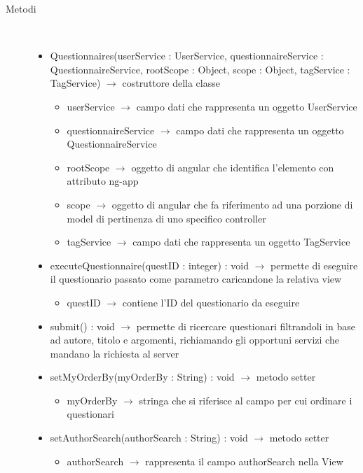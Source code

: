 \begin{description}
\item[Metodi] \hfill \\
\vspace{-7mm}
\begin{itemize}
	\item Questionnaires(userService : UserService, questionnaireService : QuestionnaireService, rootScope : Object, scope : Object, tagService : TagService) $\rightarrow$ costruttore della classe\begin{itemize}
		\item userService $\rightarrow$ campo dati che rappresenta un oggetto UserService
		\item questionnaireService $\rightarrow$ campo dati che rappresenta un oggetto QuestionnaireService
		\item rootScope $\rightarrow$ oggetto di angular che identifica l’elemento con attributo ng-app
		\item scope $\rightarrow$ oggetto di angular che fa riferimento ad una porzione di model di pertinenza di uno specifico controller
		\item tagService $\rightarrow$ campo dati che rappresenta un oggetto TagService 
	\end{itemize}
	
	\item executeQuestionnaire(questID : integer) : void $\rightarrow$ permette di eseguire il questionario passato come parametro caricandone la relativa view\begin{itemize}
		\item questID $\rightarrow$ contiene l'ID del questionario da eseguire
	\end{itemize}
	
	\item submit() : void $\rightarrow$ permette di ricercare questionari filtrandoli in base ad autore, titolo e argomenti, richiamando gli opportuni servizi che mandano la richiesta al server
	\item setMyOrderBy(myOrderBy : String) : void $\rightarrow$ metodo setter\begin{itemize}
		\item myOrderBy $\rightarrow$ stringa che si riferisce al campo per cui ordinare i questionari
	\end{itemize}
	
	\item setAuthorSearch(authorSearch : String) : void $\rightarrow$ metodo setter\begin{itemize}
		\item authorSearch $\rightarrow$ rappresenta il campo authorSearch nella View
	\end{itemize}
	

\end{itemize}
\end{description}
